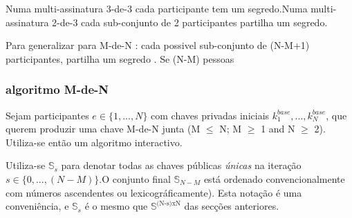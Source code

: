 
Numa multi-assinatura 3-de-3 cada participante tem um segredo.\newline Numa multi-assinatura 2-de-3 cada sub-conjunto de 2 participantes partilha um segredo. 

Para generalizar para M-de-N : cada possivel sub-conjunto de (N-M+1) participantes, partilha um segredo \cite{old-multisig-mrl-note}. Se (N-M) pessoas 
 


\subsubsection*{algoritmo M-de-N}

Sejam participantes $e \in \{1,...,N\}$ com chaves privadas iniciais $k^{base}_1,...,k^{base}_N$, que querem produzir uma chave M-de-N junta (M $\leq$ N; M $\geq$ 1 and N $\geq$ 2). Utiliza-se então um algoritmo interactivo.

Utiliza-se $\mathbb{S}_s$ para denotar todas as chaves públicas {\em únicas} na iteração $s \in \{0,...,(N-M)\}$.\newline O conjunto final $\mathbb{S}_{N-M}$ está ordenado convencionalmente com números ascendentes ou lexicográficamente). Esta notação é uma conveniência, e $\mathbb{S}_s$ é o mesmo que $\mathbb{S}^{\textrm{(N-s)xN}}$ das secções anteriores.

